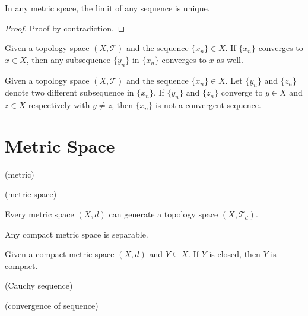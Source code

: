 \begin{theorem}
In any metric space, the limit of any sequence is unique. 
\end{theorem}

\begin{proof}
Proof by contradiction. 
\end{proof}

\begin{theorem}
Given a topology space $(X, \mathcal{T})$ and the sequence $\{x_n\} \in X$. If $\{x_n\}$ converges to $x \in X$, then any subsequence $\{y_n\}$ in $\{x_n\}$ converges to $x$ as well. 
\end{theorem}

\begin{corollary}
Given a topology space $(X, \mathcal{T})$ and the sequence $\{x_n\} \in X$. Let $\{y_n\}$ and $\{z_n\}$ denote two different subsequence in $\{x_n\}$. If $\{y_n\}$ and $\{z_n\}$ converge to $y \in X$ and $z \in X$ respectively with $y \neq z$, then $\{x_n\}$ is not a convergent sequence. 
\end{corollary}

\section{Metric Space}

\begin{definition}
(metric)
\end{definition}

\begin{definition}
(metric space)
\end{definition}

\begin{theorem}
Every metric space $(X, d)$ can generate a topology space $(X, \mathcal{T}_{d})$. 
\end{theorem}

\begin{theorem}
Any compact metric space is separable. 
\end{theorem}

\begin{theorem}
Given a compact metric space $(X, d)$ and $Y \subseteq X$. If $Y$ is closed, then $Y$ is compact. 
\end{theorem}

\begin{definition}
(Cauchy sequence)
\end{definition}

\begin{definition}
(convergence of sequence)
\end{definition}

